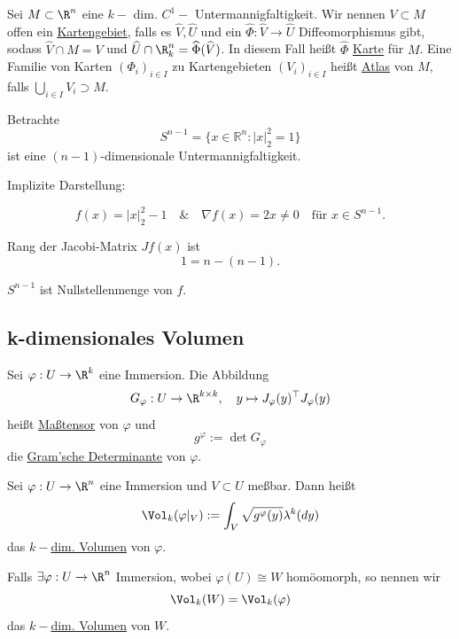\documentclass[11pt, a4paper]{article}
\begin{document}
\begin{definition} Sei $M\subset \R^n$ eine $k-$ dim. $C^1-$ Untermannigfaltigkeit. Wir nennen $V\subset M$ offen ein \underline{Kartengebiet}, falls es $\widehat V , \widehat U$ und ein $\widehat \Phi: \widehat V \to \widehat U$ Diffeomorphismus gibt, sodass $\widehat V \cap M = V$ und $\widehat U \cap \R^n_k = \widehat \Phi (\widehat V)$. In diesem Fall heißt $\widehat \Phi$ \underline{Karte} für $M$. Eine Familie von Karten $(\Phi_i)_{i\in I}$ zu Kartengebieten $(V_i)_{i\in I}$ heißt \underline{Atlas} von $M$, falls $\bigcup_{i\in I} V_i \supset M$.
\end{definition}
\begin{example}  Betrachte 
\[
S^{n-1}
=
\{x \in \mathbb{R}^n : |x|_2^2 = 1\}
\]
ist eine $(n-1)$-dimensionale Untermannigfaltigkeit.\bigskip

Implizite Darstellung:

\[
f(x)=|x|_2^2 -1 \quad \& \quad \nabla f(x)=2x \neq 0 \quad \text{für } x\in S^{n-1}.
\]

Rang der Jacobi-Matrix $Jf(x)$ ist
\[
1 = n-(n-1).
\]

$S^{n-1}$ ist Nullstellenmenge von $f$.

\end{example}


\vspace{0.3cm} \par \subsection{k-dimensionales Volumen}



\begin{definition}  Sei $\varphi: U \to \R^k$ eine Immersion. Die Abbildung
$$G_\varphi: U \to \R^{k\times k}, \quad y\mapsto J_\varphi(y)^\top J_\varphi (y)$$
heißt \underline{Maßtensor} von $\varphi$ und 
$$g^\varphi := \det G_\varphi$$
die \underline{Gram'sche Determinante} von $\varphi$.
\end{definition}

\begin{definition} 
    Sei $\varphi: U \to \R^n$ eine Immersion und $V\subset U$ meßbar. Dann heißt
    $$\Vol_k(\varphi|_V) := \int _V \sqrt{g^\varphi(y)} \lambda^k(dy)$$
    das \underline{$k-$dim. Volumen} von $\varphi$.\bigskip

    Falls $\exists \varphi: U \to \R^n$ Immersion, wobei $\varphi(U)\cong W$ homöomorph, so nennen wir 
    $$\Vol_k(W) = \Vol_k(\varphi) $$
    das  \underline{$k-$dim. Volumen} von $W$.
\end{definition}
\end{document}
